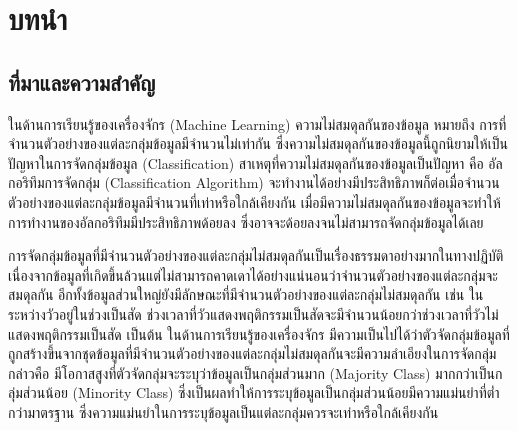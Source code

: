 \chapter{บทนำ}
\label{chapter:introduction}

\section{ที่มาและความสำคัญ}
ในด้านการเรียนรู้ของเครื่องจักร (Machine Learning) ความไม่สมดุลกันของข้อมูล หมายถึง การที่จำนวนตัวอย่างของแต่ละกลุ่มข้อมูลมีจำนวนไม่เท่ากัน 
ซึ่งความไม่สมดุลกันของข้อมูลนี้ถูกนิยามให้เป็นปัญหาในการจัดกลุ่มข้อมูล (Classification) สาเหตุที่ความไม่สมดุลกันของข้อมูลเป็นปัญหา คือ อัลกอริทึมการจัดกลุ่ม 
(Classification Algorithm) จะทำงานได้อย่างมีประสิทธิภาพก็ต่อเมื่อจำนวนตัวอย่างของแต่ละกลุ่มข้อมูลมีจำนวนที่เท่าหรือใกล้เคียงกัน 
เมื่อมีความไม่สมดุลกันของข้อมูลจะทำให้การทำงานของอัลกอริทึมมีประสิทธิภาพด้อยลง ซึ่งอาจจะด้อยลงจนไม่สามารถจัดกลุ่มข้อมูลได้เลย

การจัดกลุ่มข้อมูลที่มีจำนวนตัวอย่างของแต่ละกลุ่มไม่สมดุลกันเป็นเรื่องธรรมดาอย่างมากในทางปฏิบัติ 
เนื่องจากข้อมูลที่เกิดขึ้นล้วนแต่ไม่สามารถคาดเดาได้อย่างแน่นอนว่าจำนวนตัวอย่างของแต่ละกลุ่มจะสมดุลกัน อีกทั้งข้อมูลส่วนใหญ่ยังมีลักษณะที่มีจำนวนตัวอย่างของแต่ละกลุ่มไม่สมดุลกัน 
เช่น ในระหว่างวัวอยู่ในช่วงเป็นสัด ช่วงเวลาที่วัวแสดงพฤติกรรมเป็นสัดจะมีจำนวนน้อยกว่าช่วงเวลาที่วัวไม่แสดงพฤติกรรมเป็นสัด เป็นต้น ในด้านการเรียนรู้ของเครื่องจักร 
มีความเป็นไปได้ว่าตัวจัดกลุ่มข้อมูลที่ถูกสร้างขึ้นจากชุดข้อมูลที่มีจำนวนตัวอย่างของแต่ละกลุ่มไม่สมดุลกันจะมีความลำเอียงในการจัดกลุ่ม กล่าวคือ 
มีโอกาสสูงที่ตัวจัดกลุ่มจะระบุว่าข้อมูลเป็นกลุ่มส่วนมาก (Majority Class) มากกว่าเป็นกลุ่มส่วนน้อย (Minority Class) 
ซึ่งเป็นผลทำให้การระบุข้อมูลเป็นกลุ่มส่วนน้อยมีความแม่นยำที่ต่ำกว่ามาตรฐาน ซึ่งความแม่นยำในการระบุข้อมูลเป็นแต่ละกลุ่มควรจะเท่าหรือใกล้เคียงกัน

